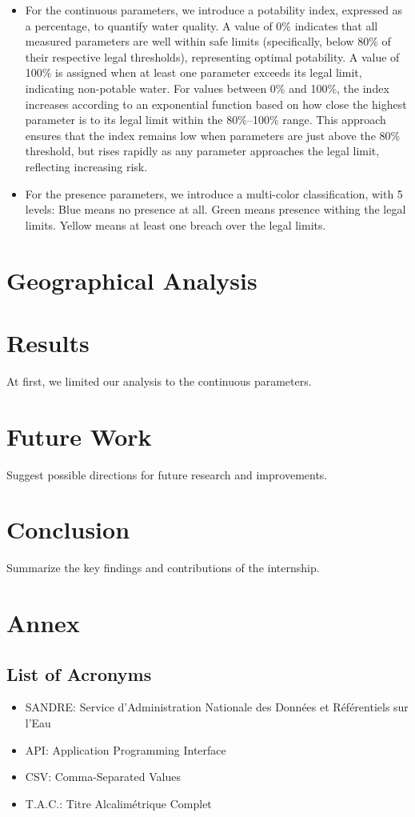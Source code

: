 \documentclass{article}
\begin{document}
\begin{itemize}
    \item For the continuous parameters, we introduce a potability index, expressed as a percentage, to quantify water quality. A value of 0\% indicates that all measured parameters are well within safe limits (specifically, below 80\% of their respective legal thresholds), representing optimal potability. A value of 100\% is assigned when at least one parameter exceeds its legal limit, indicating non-potable water. For values between 0\% and 100\%, the index increases according to an exponential function based on how close the highest parameter is to its legal limit within the 80\%–100\% range. This approach ensures that the index remains low when parameters are just above the 80\% threshold, but rises rapidly as any parameter approaches the legal limit, reflecting increasing risk.
    \item For the presence parameters, we introduce a multi-color classification, with 5 levels: Blue means no presence at all. Green means presence withing the legal limits. Yellow means at least one breach over the legal limits. 
\end{itemize}

\section{Geographical Analysis}


\section{Results}
At first, we limited our analysis to the continuous parameters.


\section{Future Work}
Suggest possible directions for future research and improvements.

\section{Conclusion}
Summarize the key findings and contributions of the internship.

\appendix
\section{Annex}

\subsection{List of Acronyms}
\begin{itemize}
    \item SANDRE: Service d’Administration Nationale des Données et Référentiels sur l’Eau
    \item API: Application Programming Interface
    \item CSV: Comma-Separated Values
    \item T.A.C.: Titre Alcalimétrique Complet
\end{itemize}
\end{document}
